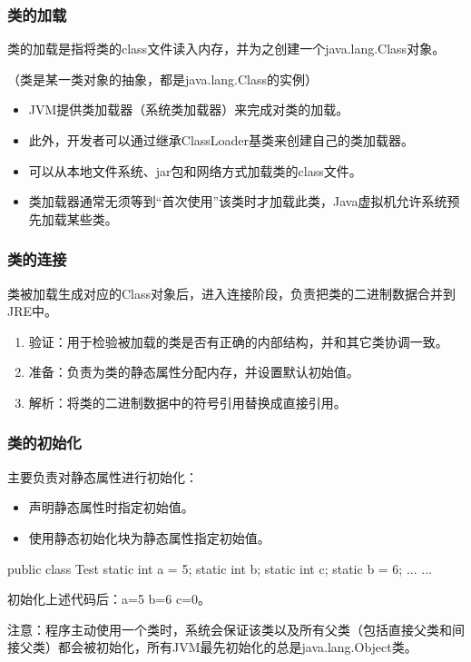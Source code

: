 \documentclass[hyperref={pdfpagelabels=false},compress,table]{beamer} %
\newcommand{\kai}{\CJKfamily{KaiTi}}
\def\Red{\color{red}}
\begin{document}
\begin{frame}[fragile] %
\frametitle{类的加载}

类的加载是指将类的class文件读入内存，并为之创建一个java.lang.Class对象。

{\Red （类是某一类对象的抽象，都是java.lang.Class的实例）}

\begin{itemize}\kai
\item JVM提供类加载器（系统类加载器）来完成对类的加载。
\item 此外，开发者可以通过继承ClassLoader基类来创建自己的类加载器。
\item 可以从本地文件系统、jar包和网络方式加载类的class文件。
\item 类加载器通常无须等到“首次使用”该类时才加载此类，Java虚拟机允许系统预先加载某些类。
\end{itemize}

\end{frame}

\begin{frame}[fragile] %
\frametitle{类的连接}

类被加载生成对应的Class对象后，进入连接阶段，负责把类的二进制数据合并到JRE中。

\begin{enumerate}
\item 验证：用于检验被加载的类是否有正确的内部结构，并和其它类协调一致。
\item 准备：负责为类的静态属性分配内存，并设置默认初始值。
\item 解析：将类的二进制数据中的符号引用替换成直接引用。
\end{enumerate}
\end{frame}

\begin{frame}[fragile] %
\frametitle{类的初始化}

主要负责对静态属性进行初始化：
\begin{itemize}
\item 声明静态属性时指定初始值。
\item 使用静态初始化块为静态属性指定初始值。
\end{itemize}

\begin{javaCode}
public class Test {
  static int a = 5;
  static int b;
  static int c;
  static {
    b = 6;
  }
  ... ...
}  
\end{javaCode}
初始化上述代码后：a=5 b=6 c=0。

{\kai\Red 注意：程序主动使用一个类时，系统会保证该类以及所有父类（包括直接父类和间接父类）都会被初始化，所有JVM最先初始化的总是java.lang.Object类。}
\end{frame}
\end{document}
